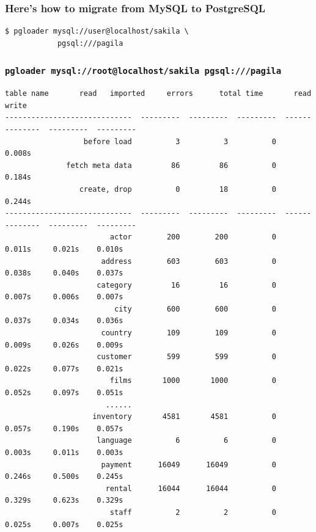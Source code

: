 \documentclass{beamer}
\begin{document}
\begin{frame}[fragile]
  \frametitle{Here's how to migrate from MySQL to PostgreSQL}

  \vfill

\begin{Verbatim}[fontsize=\Large]
 $ pgloader mysql://user@localhost/sakila \
            pgsql:///pagila
\end{Verbatim}
\end{frame}

\begin{frame}[fragile]
  \frametitle{\small{\texttt{pgloader mysql://root@localhost/sakila pgsql:///pagila}}}

\begin{Verbatim}[fontsize=\tiny]
                   table name       read   imported     errors      total time       read      write
-----------------------------  ---------  ---------  ---------  --------------  ---------  ---------
                  before load          3          3          0          0.008s                     
              fetch meta data         86         86          0          0.184s                     
                 create, drop          0         18          0          0.244s                     
-----------------------------  ---------  ---------  ---------  --------------  ---------  ---------
                        actor        200        200          0          0.011s     0.021s    0.010s
                      address        603        603          0          0.038s     0.040s    0.037s
                     category         16         16          0          0.007s     0.006s    0.007s
                         city        600        600          0          0.037s     0.034s    0.036s
                      country        109        109          0          0.009s     0.026s    0.009s
                     customer        599        599          0          0.022s     0.077s    0.021s
                        films       1000       1000          0          0.052s     0.097s    0.051s
                       ......
                    inventory       4581       4581          0          0.057s     0.190s    0.057s
                     language          6          6          0          0.003s     0.011s    0.003s
                      payment      16049      16049          0          0.246s     0.500s    0.245s
                       rental      16044      16044          0          0.329s     0.623s    0.329s
                        staff          2          2          0          0.025s     0.007s    0.025s

\end{Verbatim}
\end{frame}
\end{document}
